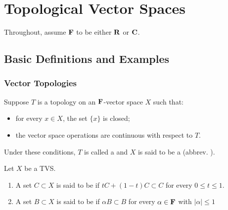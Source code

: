 \chapter{Topological Vector Spaces}

Throughout, assume $\mathbf{F}$ to be either $\mathbf{R}$ or $\mathbf{C}$.

\section{Basic Definitions and Examples}

\subsection{Vector Topologies}

\begin{definition}
	Suppose $T$ is a topology on an $\mathbf{F}$-vector space $X$ such that:
	\mbox{}
	\begin{itemize}[itemsep=1pt,topsep=3pt]
		\item for every $x \in X$, the set $\{x\}$ is closed;
		\item the vector space operations are continuous with respect to $T$.
	\end{itemize}
	Under these conditions, $T$ is called a  and $X$ is said to be a  (abbrev. ).
\end{definition}

\begin{definition}
	Let $X$ be a TVS.
	\mbox{}
	\begin{enumerate}[label = (\alph*),itemsep=1pt,topsep=3pt]
		\item A set $C \subset X$ is said to be  if $tC + (1-t)C \subset C$ for every $0 \leq t \leq 1$.
		\item A set $B \subset X$ is said to be  if $\alpha B \subset B$ for every $\alpha \in \mathbf{F}$ with $|\alpha| \leq 1$
	\end{enumerate}
\end{definition}

